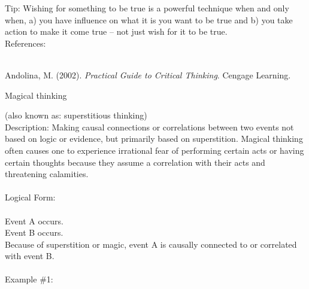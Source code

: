 \documentclass[a4paper,12pt,single,pdftex]{scrartcl}
\begin{document}
{    
      Tip: Wishing for something to be true is a powerful technique when and only when, a) you have influence on what it is you want to be true and b) you take action to make it come true -- not just wish for it to be true.
    \\

    References:

    
      
        
      \\

      
        
          Andolina, M. (2002). {\it Practical Guide to Critical Thinking}. Cengage Learning.
        
      
    
  }


Magical thinking
    
      (also known as: superstitious thinking)
    \\

  
    
      Description: Making causal connections or correlations between two events not based on logic or evidence, but primarily based on superstition.  Magical thinking often causes one to experience irrational fear of performing certain acts or having certain thoughts because they assume a correlation with their acts and threatening calamities.
    \\

    
      
    \\

    
      Logical Form:
    \\

    
      
    \\

    
      Event A occurs.
    \\

    
      Event B occurs.
    \\

    
      Because of superstition or magic, event A is causally connected to or correlated with event B.
    \\

    
      
    \\

    
      Example \#1:
    \\

    
      
\end{document}
